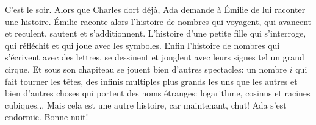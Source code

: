 C'est le soir. Alors que Charles dort déjà, Ada demande à Émilie de lui raconter une histoire. Émilie raconte alors l'histoire de nombres qui voyagent, qui avancent et reculent, sautent et s'additionnent. L'histoire d'une petite fille qui s'interroge, qui réfléchit et qui joue avec les symboles. Enfin l'histoire de nombres qui s'écrivent avec des lettres, se dessinent et jonglent avec leurs signes tel un grand cirque. Et sous son chapiteau se jouent bien d'autres spectacles: un nombre $i$ qui fait tourner les têtes, des infinis multiples plus grands les uns que les autres et bien d'autres choses qui portent des noms étranges: logarithme, cosinus et racines cubiques...
Mais cela est une autre histoire, car maintenant, chut! Ada s'est endormie. Bonne nuit!

\vspace*{\fill}
